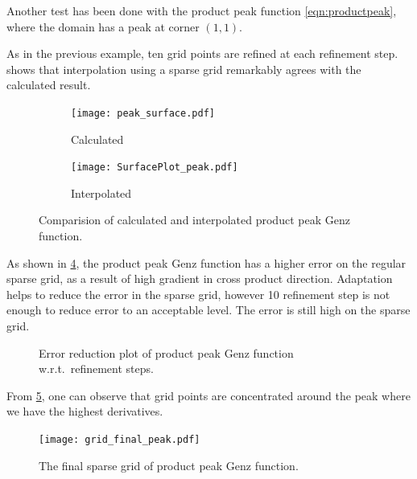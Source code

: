 Another test has been done with the product peak function \cref{eqn:productpeak}, where the domain has a peak at corner \((1,1)\).

As in the previous example, ten grid points are refined at each refinement step.  shows that interpolation using a sparse grid remarkably agrees with the calculated result.

\begin{figure}
    \centering
    \begin{subfigure}{0.45\textwidth}
        \texttt{[image: peak\_surface.pdf]}
        \caption{Calculated}
        \label{fig:peakcalculated}
    \end{subfigure}
    \begin{subfigure}{0.45\textwidth}
        \texttt{[image: SurfacePlot\_peak.pdf]}
        \caption{Interpolated}
        \label{fig:pekainterpolated}
    \end{subfigure}
    \caption{Comparision of calculated and interpolated product peak Genz function.}
    \label{fig:peaksurface}
\end{figure}

As shown in \cref{fig:peakerr}, the product peak Genz function has a higher error on the regular sparse grid, as a result of high gradient in cross product direction. Adaptation helps to reduce the error in the sparse grid, however 10 refinement step is not enough to reduce error to an acceptable level. The error is still high on the sparse grid.

\begin{figure}
    \centering
    \scalebox{0.9}{}
    \caption{Error reduction plot of product peak Genz function w.r.t.\ refinement steps.}
    \label{fig:peakerr}
\end{figure}

From \cref{fig:peakgrid}, one can observe that grid points are concentrated around the peak where we have the highest derivatives.

\begin{figure}
    \centering
    \texttt{[image: grid\_final\_peak.pdf]}
    \caption{The final sparse grid of product peak Genz function.}
    \label{fig:peakgrid}
\end{figure}